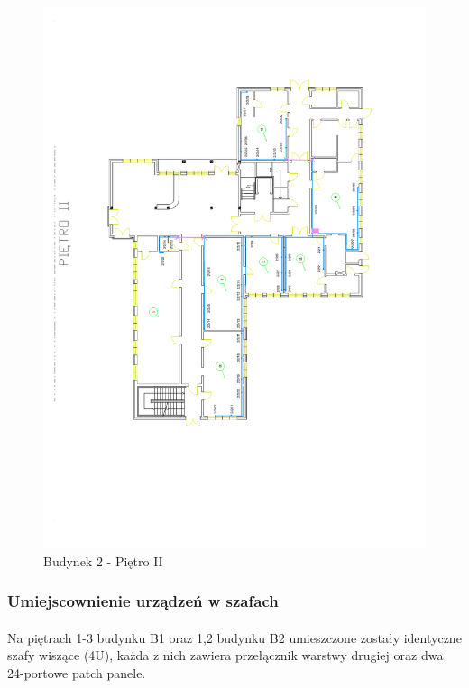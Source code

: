 \begin{figure}[H]
  \begin{center}
    \includegraphics[width=\textwidth]{img/s/b2-2.pdf}
    \caption{Budynek 2 - Piętro II}
  \end{center}
\end{figure}


\subsubsection{Umiejscownienie urządzeń w szafach}


\paragraph{}
Na piętrach 1-3 budynku B1 oraz 1,2 budynku B2 umieszczone zostały identyczne szafy wiszące (4U), każda z nich zawiera przełącznik warstwy drugiej oraz dwa 24-portowe patch panele.

